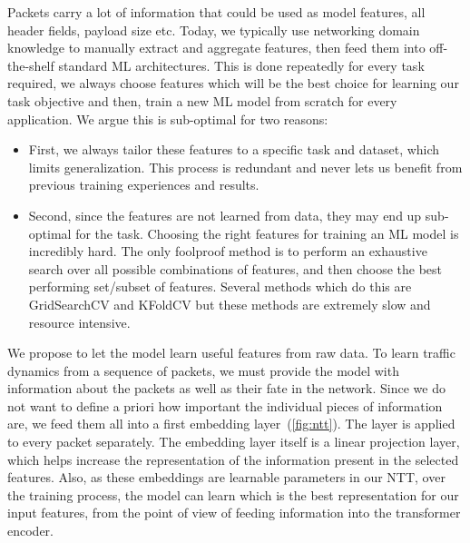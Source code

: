 Packets carry a lot of information that could be used as model features, \eg all header fields, payload size etc. Today, we typically use networking domain knowledge to manually extract and aggregate features, then feed them into off-the-shelf standard ML architectures. This is done repeatedly for every task required, we always choose features which will be the best choice for learning our task objective and then, train a new ML model from scratch for every application.
We argue this is sub-optimal for two reasons:
\begin{itemize}
\item First, we always tailor these features to a specific task and dataset, which limits generalization. This process is redundant and never lets us benefit from previous training experiences and results.
\item Second, since the features are not learned from data, they may end up sub-optimal for the task. Choosing the right features for training an ML model is incredibly hard. The only foolproof method is to perform an exhaustive search over all possible combinations of features, and then choose the best performing set/subset of features. Several methods which do this are GridSearchCV and KFoldCV\cite{scikit-learn} but these methods are extremely slow and resource intensive.
\end{itemize}

We propose to let the model learn useful features from raw data. To learn traffic dynamics from a sequence of packets, we must provide the model with information about the packets as well as their fate in the network. Since we do not want to define a priori how important the individual pieces of information are, we feed them all into a first embedding layer~(\ref{fig:ntt}). The layer is applied to every packet separately. The embedding layer itself is a linear projection layer, which helps increase the representation of the information present in the selected features. Also, as these embeddings are learnable parameters in our NTT, over the training process, the model can learn which is the best representation for our input features, from the point of view of feeding information into the transformer encoder.


